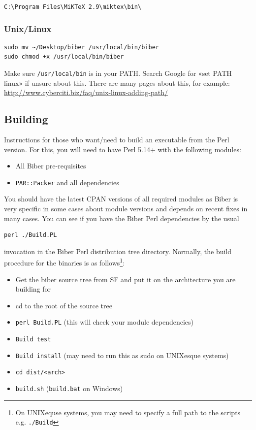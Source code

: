 \documentclass{ltxdockit}
\begin{document}
\begin{verbatim}
C:\Program Files\MiKTeX 2.9\miktex\bin\
\end{verbatim}

\subsubsection{Unix/Linux}

\begin{verbatim}
sudo mv ~/Desktop/biber /usr/local/bin/biber
sudo chmod +x /usr/local/bin/biber
\end{verbatim}

\noindent Make sure \verb+/usr/local/bin+ is in your PATH. Search Google for «set PATH
linux» if unsure about this. There are many pages about this, for example:
\url{http://www.cyberciti.biz/faq/unix-linux-adding-path/}


\subsection{Building}

Instructions for those who want/need to build an executable from the
Perl version. For this, you will need to have Perl 5.14+ with
the following modules:

\begin{itemize}
\item All Biber pre-requisites
\item \verb+PAR::Packer+ and all dependencies
\end{itemize}

\noindent You should have the latest CPAN versions of all required modules
as Biber is very specific in some cases about module versions and
depends on recent fixes in many cases. You can see if you have the
Biber Perl dependencies by the usual

\begin{verbatim}
perl ./Build.PL
\end{verbatim}

\noindent invocation in the Biber Perl distribution tree
directory. Normally, the build procedure for the binaries is as
follows\footnote{On UNIXequse systems, you may need to specify a full
  path to the scripts e.g. \texttt{./Build}}:

\begin{itemize}
\item Get the biber source tree from SF and put it on the architecture
  you are building for
\item cd to the root of the source tree
\item \verb+perl Build.PL+ (this will check your module
  dependencies)
\item \verb+Build test+
\item \verb+Build install+ (may need to run this as sudo on
  UNIXesque systems)
\item \verb+cd dist/<arch>+
\item \verb+build.sh+ (\verb+build.bat+ on Windows)
\end{itemize}
\end{document}

